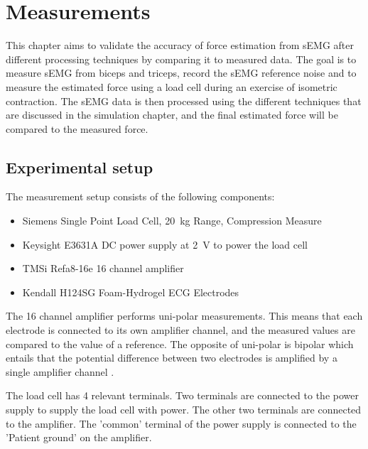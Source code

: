 \chapter{Measurements}\label{sec:measurements}
This chapter aims to validate the accuracy of force estimation from sEMG after different processing techniques by comparing it to measured data. The goal is to measure sEMG from biceps and triceps,  record the sEMG reference noise and to measure the estimated force using a load cell during an exercise of isometric contraction. The sEMG data is then processed using the different techniques that are discussed in the simulation chapter, and the final estimated force will be compared to the measured force. 

\section{Experimental setup}
The measurement setup consists of the following components:
\begin{itemize}
    \item Siemens Single Point Load Cell, \SI{20}{\kilo\gram} Range, Compression Measure
    \item Keysight E3631A DC power supply at \SI{2}{\volt} to power the load cell
    \item TMSi Refa8-16e 16 channel amplifier
    \item Kendall H124SG Foam-Hydrogel ECG Electrodes 
\end{itemize}

The 16 channel amplifier performs uni-polar measurements. This means that each electrode is connected to its own amplifier channel, and the measured values are compared to the value of a reference. The opposite of uni-polar is bipolar which entails that the potential difference between two electrodes is amplified by a single amplifier channel \cite{tmsi_unipolar_bipolar}. 

The load cell has 4 relevant terminals. Two terminals are connected to the power supply to supply the load cell with power. The other two terminals are connected to the amplifier. The 'common' terminal of the power supply is connected to the 'Patient ground' on the amplifier.

